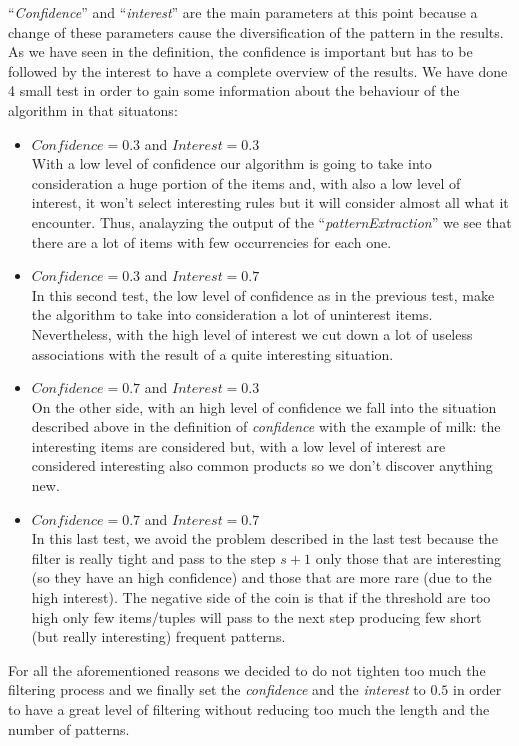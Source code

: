 \documentclass{acm_proc_article-sp-sigmod09}
\begin{document}
	``\textit{Confidence}'' and ``\textit{interest}'' are the main parameters at this point because a change of these parameters cause the diversification of the pattern in the results.
	As we have seen in the definition, the confidence is important but has to be followed by the interest to have a complete overview of the results. We have done 4 small test in order to gain some information about the behaviour of the algorithm in that situatons:
	\begin{itemize}
		\item $Confidence = 0.3$ and $Interest = 0.3$ \\
		With a low level of confidence our algorithm is going to take into consideration a huge portion of the items and, with also a low level of interest, it won't select interesting rules but it will consider almost all what it encounter. Thus, analayzing the output of the ``\textit{patternExtraction}'' we see that there are a lot of items with few occurrencies for each one.
		\item $Confidence = 0.3$ and $Interest = 0.7$ \\
		In this second test, the low level of confidence as in the previous test, make the algorithm to take into consideration a lot of uninterest items. Nevertheless, with the high level of interest we cut down a lot of useless associations with the result of a quite interesting situation.
		\item $Confidence = 0.7$ and $Interest = 0.3$ \\
		On the other side, with an high level of confidence we fall into the situation described above in the definition of \textit{confidence} with the example of milk: the interesting items are considered but, with a low level of interest are considered interesting also common products so we don't discover anything new.
		\item $Confidence = 0.7$ and $Interest = 0.7$ \\
		In this last test, we avoid the problem described in the last test because the filter is really tight and pass to the step $s+1$ only those that are interesting (so they have an high confidence) and those that are more rare (due to the high interest). The negative side of the coin is that if the threshold are too high only few items/tuples will pass to the next step producing few short (but really interesting) frequent patterns.
	\end{itemize} 
	
	For all the aforementioned reasons we decided to do not tighten too much the filtering process and we finally set the \textit{confidence} and the \textit{interest} to $0.5$ in order to have a great level of filtering without reducing too much the length and the number of patterns.	
	
\end{document}
